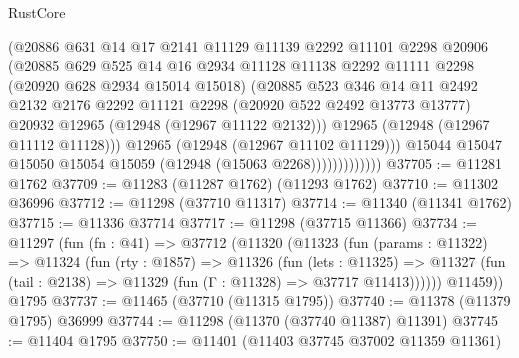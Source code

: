 \begin{lexlean}{RustCore}
\begin{coremodule}
                          (@20886
                            @631
                            @14
                            @17
                            @2141
                            @11129
                            @11139
                            @2292
                            @11101
                            @2298
                            @20906
                            (@20885
                              @629
                              @525
                              @14
                              @16
                              @2934
                              @11128
                              @11138
                              @2292
                              @11111
                              @2298
                              (@20920 @628 @2934 @15014 @15018)
                              (@20885
                                @523
                                @346
                                @14
                                @11
                                @2492
                                @2132
                                @2176
                                @2292
                                @11121
                                @2298
                                (@20920 @522 @2492 @13773 @13777)
                                @20932
                                @12965
                                (@12948 (@12967 @11122 @2132)))
                              @12965
                              (@12948 (@12967 @11112 @11128)))
                            @12965
                            (@12948 (@12967 @11102 @11129)))
                          @15044
                          @15047
                          @15050
                          @15054
                          @15059
                          (@12948 (@15063 @2268)))))))))))))
@37705 := @11281 @1762
@37709 := @11283 (@11287 @1762) (@11293 @1762)
@37710 := @11302 @36996
@37712 := @11298 (@37710 @11317)
@37714 := @11340 (@11341 @1762)
@37715 := @11336 @37714
@37717 := @11298 (@37715 @11366)
@37734 := @11297
    (fun (fn : @41) =>
    @37712
      (@11320
        (@11323
          (fun (params : @11322) =>
          @11324
            (fun (rty : @1857) =>
            @11326
              (fun (lets : @11325) =>
              @11327 (fun (tail : @2138) => @11329 (fun (Γ : @11328) => @37717 @11413))))))
        @11459))
    @1795
@37737 := @11465 (@37710 (@11315 @1795))
@37740 := @11378 (@11379 @1795) @36999
@37744 := @11298 (@11370 (@37740 @11387) @11391)
@37745 := @11404 @1795
@37750 := @11401 (@11403 @37745 @37002 @11359 @11361)

\end{coremodule}
\end{lexlean}
